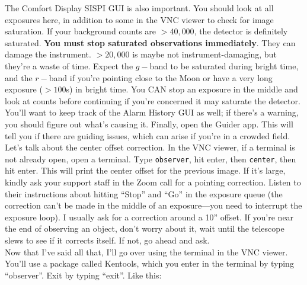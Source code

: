 The Comfort Display SISPI GUI is also important. You should look at all exposures here, in addition to some in the VNC viewer to check for image saturation. If your background counts are $>40,000$, the detector is definitely saturated. \textbf{You must stop saturated observations immediately}. They can damage the instrument. $>20,000$ is maybe not instrument-damaging, but they're a waste of time. Expect the $g-$band to be saturated during bright time, and the $r-$band if you're pointing close to the Moon or have a very long exposure ($>100$s) in bright time. You CAN stop an exposure in the middle and look at counts before continuing if you're concerned it may saturate the detector. \\

You'll want to keep track of the Alarm History GUI as well; if there's a warning, you should figure out what's causing it. Finally, open the Guider app. This will tell you if there are guiding issues, which can arise if you're in a crowded field. \\


Let's talk about the center offset correction. In the VNC viewer, if a terminal is not already open, open a terminal. Type \texttt{observer}, hit enter, then \texttt{center}, then hit enter. This will print the center offset for the previous image. If it's large, kindly ask your support staff in the Zoom call for a pointing correction. Listen to their instructions about hitting ``Stop'' and ``Go'' in the exposure queue (the correction can't be made in the middle of an exposure---you need to interrupt the exposure loop). I usually ask for a correction around a 10'' offset. If you're near the end of observing an object, don't worry about it, wait until the telescope slews to see if it corrects itself. If not, go ahead and ask.\\

Now that I've said all that, I'll go over using the terminal in the VNC viewer. You'll use a package called Kentools, which you enter in the terminal by typing ``observer''. Exit by typing ``exit''. Like this: 

